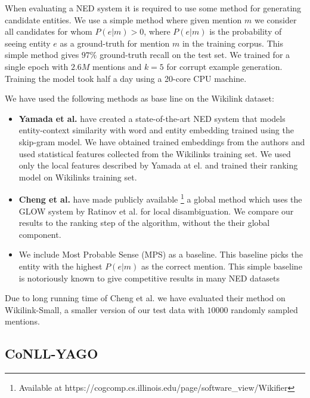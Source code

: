 \documentclass[11pt]{article}
\begin{document}
When evaluating a NED system it is required to use some method for generating candidate entities. We use a simple method where given mention $m$ we consider all candidates for whom $P(e|m)>0$, where $P(e|m)$ is the probability of seeing entity $e$ as a ground-truth for mention $m$ in the training corpus. This simple method gives $97\%$ ground-truth recall on the test set. 
We trained for a single  epoch with $2.6M$ mentions and $k=5$ for corrupt example generation. Training the model took half a day using a 20-core CPU machine.

We have used the following methods as base line on the Wikilink dataset:

\begin{itemize} 
	\item  \textbf{Yamada et al.}  have created a state-of-the-art NED system that models entity-context similarity with word and entity embedding trained using the skip-gram model. We have obtained trained embeddings from the authors and used statistical features collected from the Wikilinks training set. We used only the local features described by Yamada at el. and trained their ranking model on Wikilinks training set.
	
	\item \textbf{Cheng et al.}  have made publicly available \footnote{Available at https://cogcomp.cs.illinois.edu/page/software\_view/Wikifier } a global method which uses the GLOW system by Ratinov et al.  for local disambiguation. We compare our results to the ranking step of the algorithm, without the their global component.
	
	\item We include Most Probable Sense (MPS) as a baseline. This baseline picks the entity with the highest $P(e|m)$ as the correct mention. This simple baseline is notoriously known to give competitive results in many NED datasets 
\end{itemize}

Due to long running time of Cheng et al. we have evaluated their method on Wikilink-Small, a smaller version of our test data with $10000$ randomly sampled mentions.

\subsection{CoNLL-YAGO}
\end{document}
